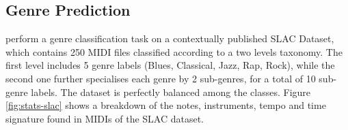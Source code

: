 \documentclass{article}
\begin{document}
\subsection{Genre Prediction}
\label{sec:genre-pred}
\cite{mckay2010datasetslac} perform a genre classification task on a contextually published SLAC Dataset, which contains 250 MIDI files classified according to a two levels taxonomy. The first level includes 5 genre labels (Blues, Classical, Jazz, Rap, Rock), while the second one further specialises each genre by 2 sub-genres, for a total of 10 sub-genre labels. The dataset is perfectly balanced among the classes. Figure \ref{fig:stats-slac} shows a breakdown of the notes, instruments, tempo and time signature found in MIDIs of the SLAC dataset.
\end{document}
